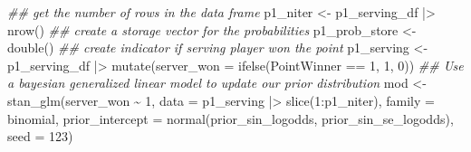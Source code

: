 \documentclass[
  letterpaper,
  DIV=11,
  numbers=noendperiod]{scrartcl}
\newenvironment{Shaded}{\begin{snugshade}}{\end{snugshade}}
\newcommand{\AttributeTok}[1]{\textcolor[rgb]{0.40,0.45,0.13}{#1}}
\newcommand{\DecValTok}[1]{\textcolor[rgb]{0.68,0.00,0.00}{#1}}
\newcommand{\DocumentationTok}[1]{\textcolor[rgb]{0.37,0.37,0.37}{\textit{#1}}}
\newcommand{\FunctionTok}[1]{\textcolor[rgb]{0.28,0.35,0.67}{#1}}
\newcommand{\NormalTok}[1]{\textcolor[rgb]{0.00,0.23,0.31}{#1}}
\newcommand{\OtherTok}[1]{\textcolor[rgb]{0.00,0.23,0.31}{#1}}
\newcommand{\SpecialCharTok}[1]{\textcolor[rgb]{0.37,0.37,0.37}{#1}}
\begin{document}
\begin{Shaded}
\begin{Highlighting}[]
\DocumentationTok{\#\# get the number of rows in the data frame}
\NormalTok{p1\_niter }\OtherTok{\textless{}{-}}\NormalTok{ p1\_serving\_df }\SpecialCharTok{|\textgreater{}} \FunctionTok{nrow}\NormalTok{()}
\DocumentationTok{\#\# create a storage vector for the probabilities}
\NormalTok{p1\_prob\_store }\OtherTok{\textless{}{-}} \FunctionTok{double}\NormalTok{()}
\DocumentationTok{\#\# create indicator if serving player won the point}
\NormalTok{p1\_serving }\OtherTok{\textless{}{-}}\NormalTok{ p1\_serving\_df }\SpecialCharTok{|\textgreater{}}
    \FunctionTok{mutate}\NormalTok{(}\AttributeTok{server\_won =} \FunctionTok{ifelse}\NormalTok{(PointWinner }\SpecialCharTok{==} \DecValTok{1}\NormalTok{, }\DecValTok{1}\NormalTok{, }\DecValTok{0}\NormalTok{))}
\DocumentationTok{\#\# Use a bayesian generalized linear model to update our prior distribution}
\NormalTok{mod }\OtherTok{\textless{}{-}} \FunctionTok{stan\_glm}\NormalTok{(server\_won }\SpecialCharTok{\textasciitilde{}} \DecValTok{1}\NormalTok{, }\AttributeTok{data =}\NormalTok{ p1\_serving }\SpecialCharTok{|\textgreater{}} \FunctionTok{slice}\NormalTok{(}\DecValTok{1}\SpecialCharTok{:}\NormalTok{p1\_niter),}
                    \AttributeTok{family =}\NormalTok{ binomial,}
                    \AttributeTok{prior\_intercept =} \FunctionTok{normal}\NormalTok{(prior\_sin\_logodds, prior\_sin\_se\_logodds),}
                    \AttributeTok{seed =} \DecValTok{123}\NormalTok{)}
\end{Highlighting}
\end{Shaded}

\linespread{2}

\linespread{0.9}
\end{document}

